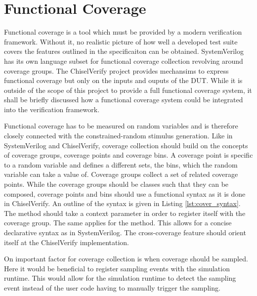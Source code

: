 \section{Functional Coverage} %

Functional coverage is a tool which must be provided by a modern verification framework. Without it, no realistic
picture of how well a developed test suite covers the features outlined in the specificaiton can be obtained.
SystemVerilog has its own language subset for functional coverage collection revolving around coverage groups. The
ChiselVerify project provides mechansims to express functional coverage but only on the inputs and ouputs of the DUT.
While it is outside of the scope of this project to provide a full functional coverage system, it shall be briefly
discussed how a functional coverage system could be integrated into the verification framework.

Functional coverage has to be measured on random variables and is therefore closely connected with the
constrained-random stimulus generation. Like in SystemVerilog and ChiselVerify, coverage collection should build on
the concepts of coverage groups, coverage points and coverage bins. A coverage point is specific to a random variable
and defines a different sets, the bins, which the random variable can take a value of. Coverage groups collect a set
of related coverage points. While the coverage groups should be classes such that they can be composed, coverage
points and bins should use a functional syntax as it is done in ChiselVerify. An outline of the syntax is given in
Listing \ref{lst:cover_syntax}. The  method should take a context parameter in order to register
itself with the coverage group. The same applies for the  method. This allows for a concise declarative
syntax as in SystemVerilog. The cross-coverage feature should orient itself at the ChiselVerify implementation.

On important factor for coverage collection is when coverage should be sampled. Here it would be beneficial to
register sampling events with the simulation runtime. This would allow for the simulation runtime to detect the
sampling event instead of the user code having to manually trigger the sampling.

